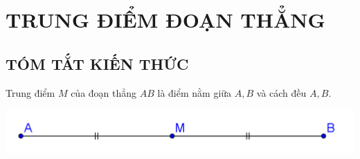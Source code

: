\section{TRUNG ĐIỂM ĐOẠN THẲNG}
\subsection{TÓM TẮT KIẾN THỨC}
\begin{tomtat}
Trung điểm $M$ của đoạn thẳng $AB$ là điểm nằm giữa $A, B$ và cách đều $A, B$.

\begin{center}
\includegraphics[scale=1]{img/Trungdiem}
\end{center}
\end{tomtat}
